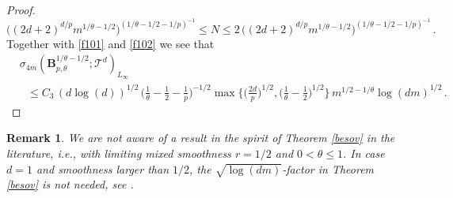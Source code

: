\documentclass[11pt,reqno]{article}
\numberwithin{equation}{section}
\theoremstyle{definition}
\theoremstyle{plain}
\newtheorem*{rem*}{Remark}
\newcommand{\be}{\begin{equation}}
\newcommand{\ee}{\end{equation}}
\begin{document}
\begin{proof}
 \be\label{eq101}
      \big((2d+2)^{d/p} m^{1/\theta-1/2}\big)^{(1/\theta-1/2 -1/p)^{-1}} \leq N \leq 2\,\big((2d+2)^{d/p} m^{1/\theta-1/2}\big)^{(1/\theta-1/2 -1/p)^{-1}}\,.
\ee
Together with \eqref{f101} and \eqref{f102} we see that 
\begin{equation}\nonumber
  \begin{split}
     &\sigma_{4m}(\mathbf{B}^{1/\theta-1/2}_{p,\theta};\mathcal{T}^d)_{L_\infty}\\ 
     &~~~\leq C_3 \,(d\log(d))^{1/2}\, \Big(\frac{1}{\theta}-\frac{1}{2}-\frac{1}{p}\Big)^{-1/2}  \max\Big\{\Big(\frac{2d}{p}\Big)^{1/2}, \Big(\frac{1}{\theta}-\frac{1}{2}\Big)^{1/2}\Big\} \, m^{1/2-1/\theta} \log(dm)^{1/2}\,.
   \end{split}
\end{equation}
\end{proof}





\begin{rem*}  
We are not aware of a result in the spirit of Theorem \ref{besov} in the literature, i.e.,  with limiting mixed smoothness $r=1/2$ and  $0<\theta\leq 1$. In case $d=1$ and smoothness larger than \(1/2\), the $\sqrt{\log(dm)}$-factor in Theorem \ref{besov} is not needed, see \cite[Sect.\ 6]{DeTe95}. 
\end{rem*}
\end{document}
